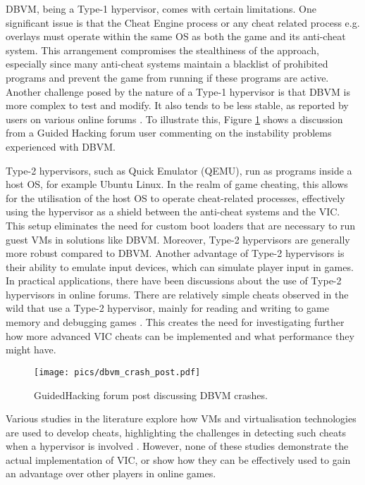 DBVM, being a Type-1 hypervisor, comes with certain limitations. One significant issue is that the Cheat Engine process or any cheat related process e.g. overlays must operate within the same OS as both the game and its anti-cheat system. This arrangement compromises the stealthiness of the approach, especially since many anti-cheat systems maintain a blacklist of prohibited programs and prevent the game from running if these programs are active. Another challenge posed by the nature of a Type-1 hypervisor is that DBVM is more complex to test and modify. It also tends to be less stable, as reported by users on various online forums \cite{dbvmcrash1,dbvmcrash2,dbvmcrash3}. To illustrate this, Figure \ref{fig:dbvm_crash} shows a discussion from a Guided Hacking forum user commenting on the instability problems experienced with DBVM.

Type-2 hypervisors, such as Quick Emulator (QEMU), run as programs inside a host OS, for example Ubuntu Linux. In the realm of game cheating, this allows for the utilisation of the host OS to operate cheat-related processes, effectively using the hypervisor as a shield between the anti-cheat systems and the VIC. This setup eliminates the need for custom boot loaders that are necessary to run guest VMs in solutions like DBVM. Moreover, Type-2 hypervisors are generally more robust compared to DBVM. Another advantage of Type-2 hypervisors is their ability to emulate input devices, which can simulate player input in games. In practical applications, there have been discussions about the use of Type-2 hypervisors in online forums. There are relatively simple cheats observed in the wild that use a Type-2 hypervisor, mainly for reading and writing to game memory and debugging games \cite{guidedHackingVMIntro,uncHyperV,pareidoliatriggerbotHypervisor}. This creates the need for investigating further how more advanced VIC cheats can be implemented and what performance they might have.

\begin{figure} [H]
   
    \texttt{[image: pics/dbvm\_crash\_post.pdf]}
    \caption{GuidedHacking forum post discussing DBVM crashes. \cite{dbvmcrash3}}
    \label{fig:dbvm_crash}
\end{figure}

 Various studies in the literature explore how VMs and virtualisation technologies are used to develop cheats, highlighting the challenges in detecting such cheats when a hypervisor is involved \cite{FengStealthMeasurements,lehtonen2020comparativeAntiCheats,spider}. However, none of these studies demonstrate the actual implementation of VIC, or show how they can be effectively used to gain an advantage over other players in online games.

